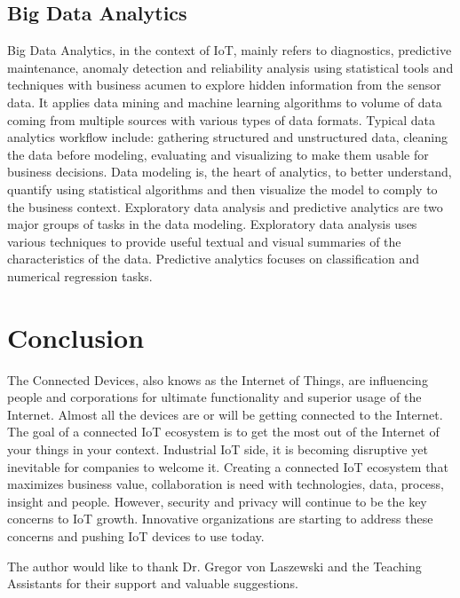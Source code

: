 \documentclass[sigconf]{acmart}
\begin{document}
	\subsection{Big Data Analytics}
	Big Data Analytics, in the context of IoT, mainly refers to diagnostics, predictive maintenance, anomaly detection and reliability analysis using statistical tools and techniques with business acumen to explore hidden information from the sensor data. It applies data mining and machine learning algorithms to volume of data coming from multiple sources with various types of data formats. Typical data analytics workflow include: gathering structured and unstructured data, cleaning the data before modeling, evaluating and visualizing to make them usable for business decisions. Data modeling is, the heart of analytics, to better understand, quantify using statistical algorithms and then visualize the model to comply to the business context. Exploratory data analysis and predictive analytics are two major groups of tasks in the data modeling. Exploratory data analysis uses various techniques to provide useful textual and visual summaries of the characteristics of the data. Predictive analytics focuses on classification and numerical regression tasks. 
	
	
	\section{Conclusion}	
	
	
	The Connected Devices, also knows as the Internet of Things, are influencing people and corporations for ultimate functionality and superior usage of the Internet. Almost all the devices are or will be getting connected to the Internet. The goal of a connected IoT ecosystem is to get the most out of the Internet of your things in your context. Industrial IoT side, it is becoming disruptive yet inevitable for companies to welcome it. Creating a connected IoT ecosystem that maximizes business value, collaboration is need with technologies, data, process, insight and people. However, security and privacy will continue to be the key concerns to IoT growth. Innovative organizations are starting to address these concerns and pushing IoT devices to use today.
	
	\begin{acks}		
	
		The author would like to thank Dr. Gregor von Laszewski and the Teaching Assistants for their support and valuable suggestions.
		
	\end{acks}

	
	 
	

	
\end{document}
